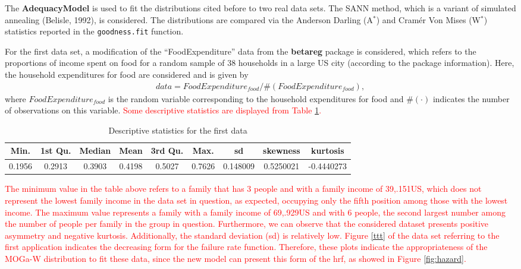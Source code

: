 \documentclass[twoside,leqno,11pt]{article}
\begin{document}
The {\bf AdequacyModel} is used to fit the distributions cited before to two real data sets. The SANN method, which is a
variant of simulated annealing (Belisle, 1992), is considered. The distributions are compared via the Anderson
Darling (A$^{*}$) and Cram\'er Von Mises (W$^{*}$) statistics reported in the {\tt goodness.fit} function.

For the first data set, a modification of the ``FoodExpenditure'' data from the {\bf betareg} package  is considered, which refers
to the proportions of income spent on food for a random sample of 38 households in a large US city (according to the package information).
Here, the household expenditures for food are considered and is given by
\begin{eqnarray*}
data = FoodExpenditure_{food} / \#(FoodExpenditure_{food}),
\end{eqnarray*}
where $FoodExpenditure_{food}$ is the random variable corresponding to the household expenditures for food and $\#(\cdot)$ indicates the number of
observations on this variable. \textcolor{red}{Some descriptive statistics are displayed from Table \ref{tabds}. }


\begin{table}[!htb] 
\scriptsize
\center
\caption{Descriptive statistics for the first data}
\label{tabds}
\begin{tabular}{ ccccccccc}
\hline\noalign{\smallskip}
   Min. & 1st Qu.&  Median&    Mean& 3rd  Qu.&    Max. & sd &skewness & kurtosis\\
   \hline
 0.1956  &0.2913 & 0.3903 & 0.4198 & 0.5027 & 0.7626 & 0.148009 & 0.5250021 & -0.4440273\\
\hline
\end{tabular}
\end{table}

\textcolor{red}{The minimum value in the table above refers to a family that has 3 people and with a family income of 39,.151US, which does not represent the lowest family income in the data set in question, as expected, occupying only the fifth position among those with the lowest income. The maximum value represents a family with a family income of 69,.929US and with 6 people, the second largest number among the number of people per family in the group in question. Furthermore, we can observe that the considered dataset presents positive asymmetry and negative kurtosis. Additionally, the standard deviation (sd) is relatively low.
Figure \ref{ttt} of the data set referring to the first application indicates the decreasing form for the failure rate function. Therefore, these plots indicate the appropriateness of the MOGa-W distribution to fit these data, since the new model can present this form of the hrf, as showed in Figure \ref{fig:hazard}.
}
\end{document}
